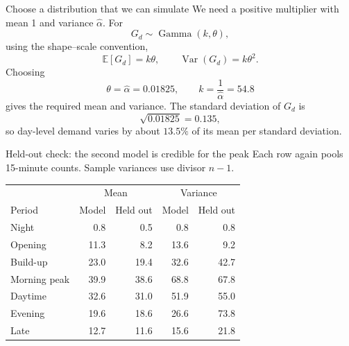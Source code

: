 \documentclass{beamer}
\begin{document}
\begin{frame}{Choose a distribution that we can simulate}
  We need a positive multiplier with mean 1 and variance $\widehat\alpha$. For
  \[
    G_d\sim\operatorname{Gamma}(k,\theta),
  \]
  using the shape--scale convention,
  \[
    \mathbb E[G_d]=k\theta,
    \qquad
    \operatorname{Var}(G_d)=k\theta^2.
  \]
  Choosing
  \[
    \theta=\widehat\alpha=0.01825,
    \qquad
    k=\frac{1}{\widehat\alpha}=54.8
  \]
  gives the required mean and variance. The standard deviation of $G_d$ is
  \[
    \sqrt{0.01825}=0.135,
  \]
  so day-level demand varies by about $13.5\%$ of its mean per standard deviation. 
\end{frame}

\begin{frame}{Held-out check: the second model is credible for the peak}
  \footnotesize
  Each row again pools 15-minute counts. Sample variances use divisor $n-1$.
  \small
  \vspace{0.2em}
  \centering
  \begin{tabular}{@{}lrrrr@{}}
    \toprule
      & \multicolumn{2}{c}{Mean} & \multicolumn{2}{c}{Variance}\\
    Period & Model & Held out & Model & Held out\\
    \midrule
    Night & 0.8 & 0.5 & 0.8 & 0.8\\
    Opening & 11.3 & 8.2 & 13.6 & 9.2\\
    Build-up & 23.0 & 19.4 & 32.6 & 42.7\\
    Morning peak & 39.9 & 38.6 & 68.8 & 67.8\\
    Daytime & 32.6 & 31.0 & 51.9 & 55.0\\
    Evening & 19.6 & 18.6 & 26.6 & 73.8\\
    Late & 12.7 & 11.6 & 15.6 & 21.8\\
    \bottomrule
  \end{tabular}
  \raggedright
\end{frame}
\end{document}

